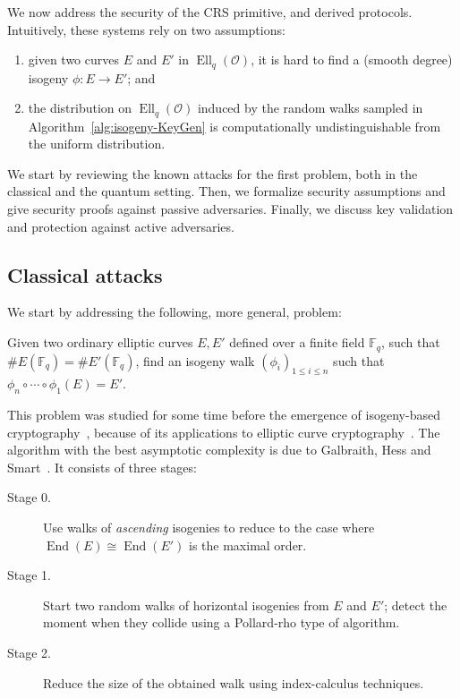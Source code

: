 \documentclass{llncs}
\newcommand{\F}{\mathbb{F}}
\renewcommand{\O}{\mathcal{O}}
\DeclareMathOperator{\End}{End}
\DeclareMathOperator{\Ell}{Ell}
\begin{document}
We now address the security of the CRS primitive, and derived
protocols. Intuitively, these systems rely on two assumptions:
\begin{enumerate}
    \item given two curves $E$ and $E'$ in $\Ell_q(\O)$, it is hard to
        find a (smooth degree) isogeny $ϕ:E→E'$; and
    \item the distribution on $\Ell_q(\O)$ induced by the random walks
        sampled in Algorithm~\ref{alg:isogeny-KeyGen} is computationally
        undistinguishable from the uniform distribution.
\end{enumerate}

We start by reviewing the known attacks for the first problem, both in
the classical and the quantum setting. Then, we formalize security
assumptions and give security proofs against passive adversaries.
Finally, we discuss key validation and protection against active
adversaries.

\subsection{Classical attacks}
\label{sec:classical-attacks}

We start by addressing the following, more general, problem:

\begin{problem}
\label{prob:isog}
  Given two ordinary elliptic curves $E,E'$ defined over a finite
  field $\F_q$, such that $\#E(\F_q)=\#E'(\F_q)$, find an isogeny walk
  $(ϕ_i)_{1≤i≤n}$ such that $ϕ_n∘\cdots∘ϕ_1(E)=E'$.
\end{problem}

This problem was studied for some time before the emergence of
isogeny-based cryptography~\cite{Gal,GHS,galbraith+stolbunov11},
because of its applications to elliptic curve
cryptography~\cite{GHS,teske06,jao+miller+venkatesan09}.  The
algorithm with the best asymptotic complexity is due to Galbraith,
Hess and Smart~\cite{GHS}. It consists of three stages:
\begin{description}
\item[Stage 0.] Use walks of \emph{ascending} isogenies to reduce to the case where
  $\End(E)\cong\End(E')$ is the maximal order.
\item[Stage 1.] Start two random walks of horizontal isogenies 
  from $E$ and $E'$; detect the
  moment when they collide using a Pollard-rho type of algorithm.
\item[Stage 2.] Reduce the size of the obtained walk using
  index-calculus techniques.
\end{description}
\end{document}
